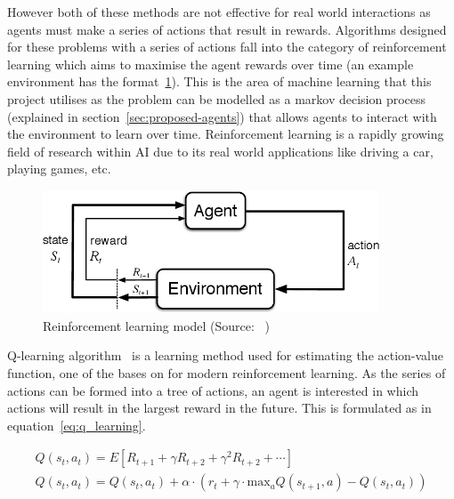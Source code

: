 However both of these methods are not effective for real world interactions as agents must make a series of
actions that result in rewards. Algorithms designed for these problems with a series of actions fall into the category
of reinforcement learning which aims to maximise the agent rewards over time (an example environment has the
format~\ref{fig:reinforcement_learning}). This is the area of machine learning that this
project utilises as the problem can be modelled as a markov decision process (explained in section~\ref{sec:proposed-agents})
that allows agents to interact with the environment to learn over time. Reinforcement learning is a rapidly growing
field of research within AI due to its real world applications like driving a car, playing games, etc.

\begin{figure}
    \includegraphics[width=10cm]{figures/reinforcement_learning.png}
    \caption{Reinforcement learning model (Source: ~\cite{Sutton1998})}
    \label{fig:reinforcement_learning}
\end{figure}

Q-learning algorithm~\cite{watkins1992q-learning} is a learning method used for estimating the action-value function,
one of the bases on for modern reinforcement learning. As the series of actions can be formed into a tree of
actions, an agent is interested in which actions will result in the largest reward in the future. This is formulated
as in equation~\eqref{eq:q_learning}.

\begin{align}
    Q(s_t, a_t) = E[R_{t+1} + \gamma R_{t+2} + \gamma^2 R_{t+2} + \cdots ] \label{eq:q_value} \\
    Q(s_t, a_t) = Q(s_t, a_t) + \alpha \cdot (r_t + \gamma \cdot \text{max}_a Q(s_{t+1} , a) - Q(s_t, a_t) ) \label{eq:q_learning} \\
\end{align}

